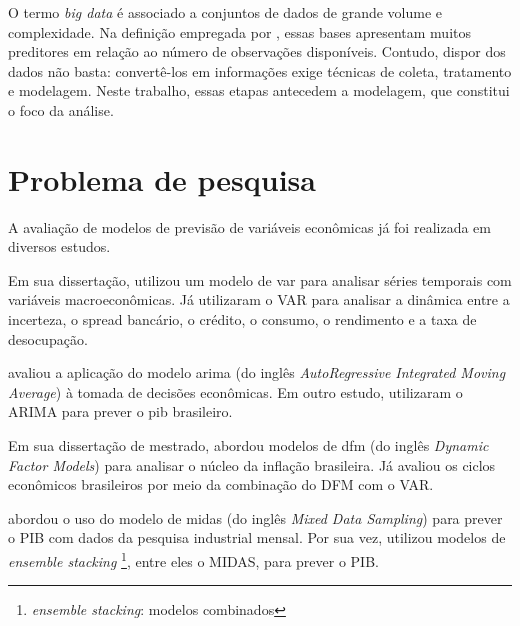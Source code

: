 O termo \textit{big data} é associado a conjuntos de dados de grande volume e complexidade. Na definição empregada por , essas bases apresentam muitos preditores em relação ao número de observações disponíveis. Contudo, dispor dos dados não basta: convertê-los em informações exige técnicas de coleta, tratamento e modelagem. Neste trabalho, essas etapas antecedem a modelagem, que constitui o foco da análise.


















\section{Problema de pesquisa}

A avaliação de modelos de previsão de variáveis econômicas já foi realizada em diversos estudos.

Em sua dissertação,  utilizou um modelo de \ac{var} para analisar séries temporais com variáveis macroeconômicas.
Já  utilizaram o VAR para analisar a dinâmica entre a incerteza, o spread bancário, o crédito, o consumo, o rendimento e a taxa de desocupação.

 avaliou a aplicação do modelo \ac{arima} (do inglês \textit{AutoRegressive Integrated Moving Average}) à tomada de decisões econômicas. Em outro estudo,  utilizaram o ARIMA para prever o \ac{pib} brasileiro.

Em sua dissertação de mestrado,  abordou modelos de \ac{dfm} (do inglês \textit{Dynamic Factor Models}) para analisar o núcleo da inflação brasileira. Já  avaliou os ciclos econômicos brasileiros por meio da combinação do DFM com o VAR.

 abordou o uso do modelo de \ac{midas} (do inglês \textit{Mixed Data Sampling}) para prever o PIB com dados da pesquisa industrial mensal. Por sua vez,  utilizou modelos de \textit{ensemble stacking} \footnote{\textit{ensemble stacking}: modelos combinados}, entre eles o MIDAS, para prever o PIB.

